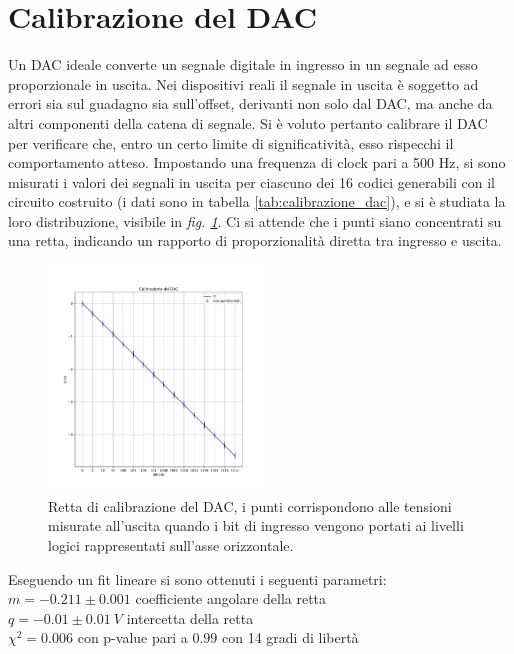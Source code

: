 \documentclass[journal]{IEEEtran}
\begin{document}

\section{Calibrazione del DAC}

Un DAC ideale converte un segnale digitale in ingresso in un segnale ad esso proporzionale in uscita. Nei dispositivi reali il segnale in uscita è soggetto ad errori sia sul guadagno sia sull'offset, derivanti non solo dal DAC, ma anche da altri componenti della catena di segnale. 
Si è voluto pertanto calibrare il DAC per verificare che, entro un certo limite di significatività, esso rispecchi il comportamento atteso.
Impostando una frequenza di clock pari a 500 Hz, si sono misurati i valori dei segnali in uscita per ciascuno dei 16 codici generabili con il circuito costruito (i dati sono in tabella \ref{tab:calibrazione_dac}), e si è studiata la loro distribuzione, visibile in \textit{fig. \ref{fig:graph_calibrazione_dac}}. Ci si attende che i punti siano concentrati su una retta, indicando un rapporto di proporzionalità diretta tra ingresso e uscita. 

\begin{figure}[H]%
\centering
\begin{center}
\includegraphics[width=0.51\textwidth]{analysis/output/calibrazione_dac.pdf}
\end{center}
\caption{Retta di calibrazione del DAC, i punti corrispondono alle tensioni misurate all'uscita quando i bit di ingresso vengono portati ai livelli logici rappresentati sull'asse orizzontale.}
\label{fig:graph_calibrazione_dac}
\end{figure}

Eseguendo un fit lineare si sono ottenuti i seguenti parametri: \\
$ m = -0.211 \pm 0.001 $ coefficiente angolare della retta\\
$ q = -0.01 \pm 0.01 \ V $ intercetta della retta\\
$ \chi^{2} = 0.006 $ con p-value pari a $0.99$ con 14 gradi di libertà
\end{document}
